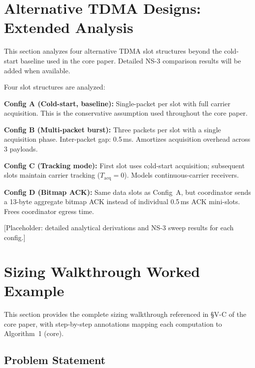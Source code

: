 \documentclass[journal]{IEEEtran}
\begin{document}
\section{Alternative TDMA Designs: Extended Analysis}
\label{sec:supp-alternatives}

This section analyzes four alternative TDMA slot structures beyond the cold-start baseline used in the core paper. Detailed NS-3 comparison results will be added when available.


Four slot structures are analyzed:

\textbf{Config A (Cold-start, baseline):} Single-packet per slot with full
carrier acquisition. This is the conservative assumption used throughout the
core paper.

\textbf{Config B (Multi-packet burst):} Three packets per slot with a single
acquisition phase. Inter-packet gap: 0.5\,ms. Amortizes acquisition overhead
across 3 payloads.

\textbf{Config C (Tracking mode):} First slot uses cold-start acquisition;
subsequent slots maintain carrier tracking ($T_{\mathrm{acq}} = 0$).
Models continuous-carrier receivers.

\textbf{Config D (Bitmap ACK):} Same data slots as Config~A, but coordinator
sends a 13-byte aggregate bitmap ACK instead of individual 0.5\,ms ACK
mini-slots. Frees coordinator egress time.

[Placeholder: detailed analytical derivations and NS-3 sweep results for each config.]


\section{Sizing Walkthrough Worked Example}
\label{sec:supp-walkthrough}

This section provides the complete sizing walkthrough referenced in \S V-C of the core paper, with step-by-step annotations mapping each computation to Algorithm~1 (core).

\subsection{Problem Statement}
\end{document}
